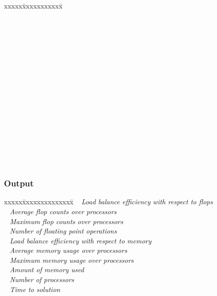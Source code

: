 \documentclass[10pt]{article}
\begin{document}
\begin{tabbing}
xxxxx\=xxxxxxxxxxx\=\kill
\> \done\  \>   \\
\> \todo\  \>   \\
\> \>   \\
\> \done\  \>   \\
\> \>   \\
\> \>   \\
\> \done\  \>   \\
\> \>   \\
\> \done\  \>   \\
\> \>   \\
\> \>   \\
\> \>   \\
\> \>   \\
\> \>   \\
\> \>   \\
\> \todo\  \>  \\
\> \todo\  \>  
\end{tabbing}


\subsubsection{Output}  \label{sss:hypre-solve-output}

\begin{tabbing}
xxxxx\=xxxxxxxxxxxxxx\=\kill
\> \todo\  \>    \textit{Load balance efficiency with respect to flops}\\
\> \todo\  \> \textit{Average flop counts over processors} \\
\> \todo\  \> \textit{Maximum flop counts over processors} \\
\> \todo\  \> \textit{Number of floating point operations} \\
\> \todo\  \>    \textit{Load balance efficiency with respect to memory}\\
\> \todo\  \> \textit{Average memory usage over processors} \\
\> \todo\  \>    \textit{Maximum memory usage over processors} \\
\> \todo\  \> \textit{Amount of memory used} \\
\> \todo\  \> \textit{Number of processors} \\
\> \todo\  \>  \textit{Time to solution}
\end{tabbing}
\end{document}
